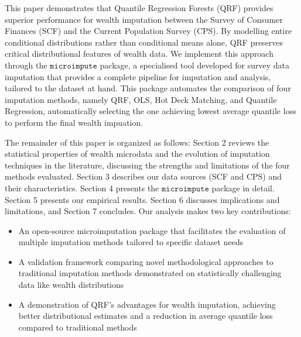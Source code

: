 This paper demonstrates that Quantile Regression Forests (QRF) provides superior performance for wealth imputation between the Survey of Consumer Finances (SCF) and the Current Population Survey (CPS). By modelling entire conditional distributions rather than conditional means alone, QRF preserves critical distributional features of wealth data. We implement this approach through the $\texttt{microimpute}$ package, a specialised tool developed for survey data imputation that provides a complete pipeline for imputation and analysis, tailored to the dataset at hand. This package automates the comparison of four imputation methods, namely QRF, OLS, Hot Deck Matching, and Quantile Regression, automatically selecting the one achieving lowest average quantile loss to perform the final wealth impuation.

The remainder of this paper is organized as follows: Section 2 reviews the statistical properties of wealth microdata and the evolution of imputation techniques in the literature, discussing the strengths and limitations of the four methods evaluated. Section 3 describes our data sources (SCF and CPS) and their characteristics. Section 4 presents the $\texttt{microimpute}$ package in detail. Section 5 presents our empirical results. Section 6 discusses implications and limitations, and Section 7 concludes.
Our analysis makes two key contributions:
\begin{itemize}
    \item An open-source microimputation package that facilitates the evaluation of multiple imputation methods tailored to specific dataset needs
    \item A validation framework comparing novel methodological approaches to traditional imputation methods demonstrated on statistically challenging data like wealth distributions
    \item A demonstration of QRF's advantages for wealth imputation, achieving better distributional estimates and a reduction in average quantile loss compared to traditional methods 
\end{itemize}